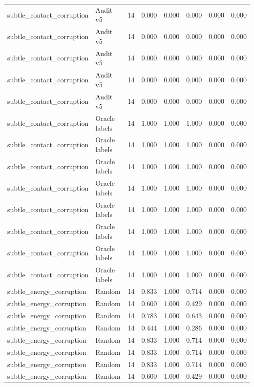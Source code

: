 {\begin{longtable}{llrrrrrr}
subtle\_contact\_corruption & Audit v5 & 14 & 0.000 & 0.000 & 0.000 & 0.000 & 0.000 \\
subtle\_contact\_corruption & Audit v5 & 14 & 0.000 & 0.000 & 0.000 & 0.000 & 0.000 \\
subtle\_contact\_corruption & Audit v5 & 14 & 0.000 & 0.000 & 0.000 & 0.000 & 0.000 \\
subtle\_contact\_corruption & Audit v5 & 14 & 0.000 & 0.000 & 0.000 & 0.000 & 0.000 \\
subtle\_contact\_corruption & Audit v5 & 14 & 0.000 & 0.000 & 0.000 & 0.000 & 0.000 \\
subtle\_contact\_corruption & Oracle labels & 14 & 1.000 & 1.000 & 1.000 & 0.000 & 0.000 \\
subtle\_contact\_corruption & Oracle labels & 14 & 1.000 & 1.000 & 1.000 & 0.000 & 0.000 \\
subtle\_contact\_corruption & Oracle labels & 14 & 1.000 & 1.000 & 1.000 & 0.000 & 0.000 \\
subtle\_contact\_corruption & Oracle labels & 14 & 1.000 & 1.000 & 1.000 & 0.000 & 0.000 \\
subtle\_contact\_corruption & Oracle labels & 14 & 1.000 & 1.000 & 1.000 & 0.000 & 0.000 \\
subtle\_contact\_corruption & Oracle labels & 14 & 1.000 & 1.000 & 1.000 & 0.000 & 0.000 \\
subtle\_contact\_corruption & Oracle labels & 14 & 1.000 & 1.000 & 1.000 & 0.000 & 0.000 \\
subtle\_contact\_corruption & Oracle labels & 14 & 1.000 & 1.000 & 1.000 & 0.000 & 0.000 \\
subtle\_energy\_corruption & Random & 14 & 0.833 & 1.000 & 0.714 & 0.000 & 0.000 \\
subtle\_energy\_corruption & Random & 14 & 0.600 & 1.000 & 0.429 & 0.000 & 0.000 \\
subtle\_energy\_corruption & Random & 14 & 0.783 & 1.000 & 0.643 & 0.000 & 0.000 \\
subtle\_energy\_corruption & Random & 14 & 0.444 & 1.000 & 0.286 & 0.000 & 0.000 \\
subtle\_energy\_corruption & Random & 14 & 0.833 & 1.000 & 0.714 & 0.000 & 0.000 \\
subtle\_energy\_corruption & Random & 14 & 0.833 & 1.000 & 0.714 & 0.000 & 0.000 \\
subtle\_energy\_corruption & Random & 14 & 0.833 & 1.000 & 0.714 & 0.000 & 0.000 \\
subtle\_energy\_corruption & Random & 14 & 0.600 & 1.000 & 0.429 & 0.000 & 0.000 \\

\end{longtable}}
